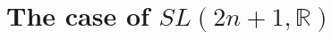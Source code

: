 \documentclass[a4paper]{jpconf}
\def\beq{\begin{equation}}
\def\eqn#1{\beq\label{#1}}
\def\ee{\end{equation}}
\def\bb {\begin {eqnarray}}
\def\eqnn#1{\bb\label{#1}}
\def\eea {\end {eqnarray}}
\def\nn{\nonumber}
\def\bbc{\mathbb{C}}%
\def\bbr{\mathbb{R}}%
\def\b{\beta}
\def\vr{\vert}
\def\l{\lambda}
\def\D{{\Delta}}
\def\ca{{\cal A}} \def\cb{{\cal B}} \def\cc{{\cal C}}
\def\cg{{\cal G}} \def\ch{{\cal H}} \def\ci{{\cal I}}
\def\L{\Lambda}
\def\r{\rho}
\begin{document}

\section{The case of $SL(2n+1,\bbr)$}
\end{document}
